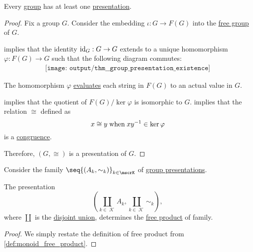 \begin{proposition}\label{thm:group_presentation_existence}
  Every \hyperref[def:group]{group} has at least one \hyperref[def:group_presentation]{presentation}.
\end{proposition}
\begin{proof}
  Fix a group \( G \). Consider the embedding \( \iota: G \to F(G) \) into the \hyperref[def:free_group]{free group} of \( G \).

   implies that the identity \( {\operatorname{id}_G: G \to G} \) extends to a unique homomorphism \( \varphi: F(G) \to G \) such that the following diagram commutes:
  \begin{equation*}
    \begin{aligned}
      \texttt{[image: output/thm\_\_group\_presentation\_existence]}
    \end{aligned}
  \end{equation*}

  The homomorphism \( \varphi \) \hyperref[con:evaluation_homomorphism]{evaluates} each string in \( F(G) \) to an actual value in \( G \).

   implies that the quotient of \( F(G) / \ker \varphi \) is isomorphic to \( G \).  implies that the relation \( {\cong} \) defined as
  \begin{equation*}
    x \cong y \T{when} xy^{-1} \in \ker \varphi
  \end{equation*}
  is a \hyperref[def:first_order_congruence]{congruence}.

  Therefore, \( (G, \cong) \) is a presentation of \( G \).
\end{proof}

\begin{proposition}\label{thm:free_product_via_presentation}
  Consider the family \( \seq{ (A_k, {\sim_k}) }_{k \in \mscrK} \) of \hyperref[def:group_presentation]{group presentations}.

  The presentation
  \begin{equation*}
    (\coprod_{k \in \mscrK} A_k, \coprod_{k \in \mscrK} {\sim_k}),
  \end{equation*}
  where \( \coprod \) is the \hyperref[def:disjoint_union]{disjoint union}, determines the \hyperref[def:monoid_free_product]{free product} of family.
\end{proposition}
\begin{proof}
  We simply restate the definition of free product from \cref{def:monoid_free_product}.
\end{proof}

